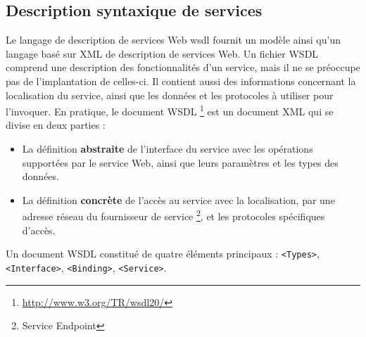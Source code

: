     	\subsection{Description syntaxique de services}
	 Le langage de description de services Web \acrshort{wsdl} \cite{chinnici2007web} fournit un modèle ainsi
	 qu'un langage basé sur \textsc{XML} de description de services Web.  Un fichier \textsc{WSDL} comprend une 
	 description des fonctionnalités d'un service, mais il ne se préoccupe pas de l'implantation de celles-ci. 
	 Il contient aussi des informations concernant la localisation du service, ainsi que les données et les 
	 protocoles à utiliser pour l'invoquer. En pratique, le document \textsc{WSDL}
	 \footnote{\url{http://www.w3.org/TR/wsdl20/}} est un document \textsc{XML} qui se divise en 
	 deux parties \cite{elie2010}:


       	 \SpecialItem 
	 \begin{itemize}  %
	    \item La définition \textbf{abstraite} de l'interface du service avec les opérations supportées par
		le service Web, ainsi que leurs paramètres et les types des données.

	    \item La définition \textbf{concrète} de l'accès au service avec la localisation, par une adresse
		réseau du fournisseur de service \footnote{Service Endpoint}, et les protocoles spécifiques d'accès.
	 \end{itemize}

	Un document \textsc{WSDL} constitué de quatre éléments principaux \cite{chinnici2007web}: 
	\texttt{<Types>}, \texttt{<Interface>}, \texttt{<Binding>}, \texttt{<Service>}.


